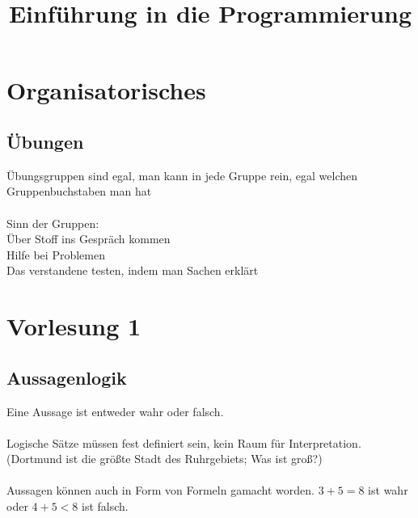 \documentclass[11pt, a4paper]{article}
\begin{document}
\title{Einführung in die Programmierung}
\maketitle

\thispagestyle{empty}


\newpage

\tableofcontents

\newpage

\section{Organisatorisches}
\subsection{Übungen}
Übungsgruppen sind egal, man kann in jede Gruppe rein, egal welchen Gruppenbuchstaben man hat\\\\Sinn der Gruppen:\\Über Stoff ins Gespräch kommen\\Hilfe bei Problemen\\Das verstandene testen, indem man Sachen erklärt
\section{Vorlesung 1}
\subsection{Aussagenlogik}
Eine Aussage ist entweder wahr oder falsch.\\\\Logische Sätze müssen fest definiert sein, kein Raum für Interpretation. (Dortmund ist die größte Stadt des Ruhrgebiets; Was ist groß?)\\\\Aussagen können auch in Form von Formeln gamacht worden. $3+5=8$ ist wahr oder $4+5<8$ ist falsch.
\end{document}
